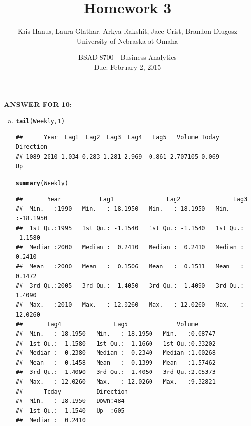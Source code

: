 \documentclass{article}\usepackage[]{graphicx}\usepackage[]{color}
\makeatletter
\newcommand{\hlnum}[1]{\textcolor[rgb]{0.686,0.059,0.569}{#1}}%
\newcommand{\hlstd}[1]{\textcolor[rgb]{0.345,0.345,0.345}{#1}}%
\newcommand{\hlkwd}[1]{\textcolor[rgb]{0.737,0.353,0.396}{\textbf{#1}}}%
\newenvironment{kframe}{%
 \def\at@end@of@kframe{}%
 \ifinner\ifhmode%
  \def\at@end@of@kframe{\end{minipage}}%
  \begin{minipage}{\columnwidth}%
 \fi\fi%
 \def\FrameCommand##1{\hskip\@totalleftmargin \hskip-\fboxsep
 \colorbox{shadecolor}{##1}\hskip-\fboxsep
     \hskip-\linewidth \hskip-\@totalleftmargin \hskip\columnwidth}%
 \MakeFramed {\advance\hsize-\width
   \@totalleftmargin\z@ \linewidth\hsize
   \@setminipage}}%
 {\par\unskip\endMakeFramed%
 \at@end@of@kframe}
\newenvironment{knitrout}{}{} %
\makeatother
\begin{document}
\title{Homework 3}
\date{BSAD 8700 - Business Analytics\\ Due: February 2, 2015}
\author{Kris Hanus, Laura Glathar, Arkya Rakshit, Jace Crist, Brandon Dlugosz\\ University of Nebraska at Omaha}
\maketitle

\textbf{ANSWER FOR 10:} \\



\begin{enumerate}[(a)]
\item
\begin{knitrout}
\color{fgcolor}\begin{kframe}
\begin{alltt}
\hlkwd{tail}\hlstd{(Weekly,} \hlnum{1}\hlstd{)}
\end{alltt}
\begin{verbatim}
##      Year  Lag1  Lag2  Lag3  Lag4   Lag5   Volume Today Direction
## 1089 2010 1.034 0.283 1.281 2.969 -0.861 2.707105 0.069        Up
\end{verbatim}
\begin{alltt}
\hlkwd{summary}\hlstd{(Weekly)}
\end{alltt}
\begin{verbatim}
##       Year           Lag1               Lag2               Lag3         
##  Min.   :1990   Min.   :-18.1950   Min.   :-18.1950   Min.   :-18.1950  
##  1st Qu.:1995   1st Qu.: -1.1540   1st Qu.: -1.1540   1st Qu.: -1.1580  
##  Median :2000   Median :  0.2410   Median :  0.2410   Median :  0.2410  
##  Mean   :2000   Mean   :  0.1506   Mean   :  0.1511   Mean   :  0.1472  
##  3rd Qu.:2005   3rd Qu.:  1.4050   3rd Qu.:  1.4090   3rd Qu.:  1.4090  
##  Max.   :2010   Max.   : 12.0260   Max.   : 12.0260   Max.   : 12.0260  
##       Lag4               Lag5              Volume       
##  Min.   :-18.1950   Min.   :-18.1950   Min.   :0.08747  
##  1st Qu.: -1.1580   1st Qu.: -1.1660   1st Qu.:0.33202  
##  Median :  0.2380   Median :  0.2340   Median :1.00268  
##  Mean   :  0.1458   Mean   :  0.1399   Mean   :1.57462  
##  3rd Qu.:  1.4090   3rd Qu.:  1.4050   3rd Qu.:2.05373  
##  Max.   : 12.0260   Max.   : 12.0260   Max.   :9.32821  
##      Today          Direction 
##  Min.   :-18.1950   Down:484  
##  1st Qu.: -1.1540   Up  :605  
##  Median :  0.2410             

\end{verbatim}
\end{kframe}
\end{knitrout}
\end{enumerate}
\end{document}
